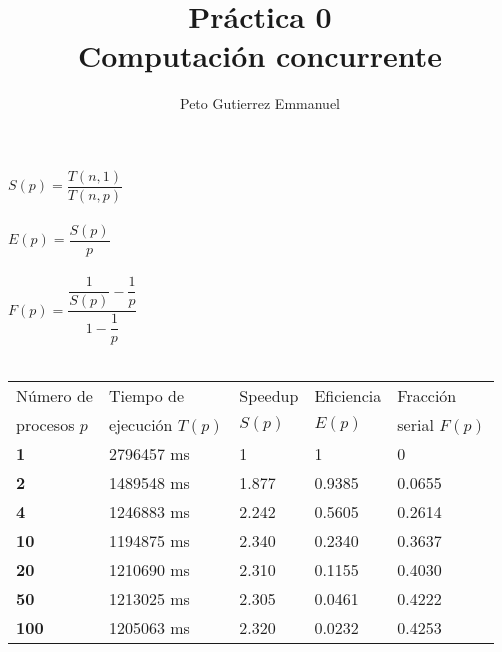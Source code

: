 \documentclass{article}
\title{Práctica 0 \\ Computación concurrente}
\author{Peto Gutierrez Emmanuel}
\begin{document}
\maketitle

$S(p)= \dfrac{T(n,1)}{T(n,p)}$ \\ \ \\

$E(p)= \dfrac{S(p)}{p}$ \\ \ \\

$F(p)= \dfrac{ \dfrac{1}{S(p)} - \dfrac{1}{p}}{1- \dfrac{1}{p}}$\\ \ \\

\begin{table}[htbp]
\begin{center}
\begin{tabular}{|l|l|l|l|l|}
\hline
Número de & Tiempo de & Speedup & Eficiencia & Fracción\\
procesos $p$ & ejecución $T(p)$ & $S(p)$ & $E(p)$ & serial $F(p)$ 
\\ \hline
\textbf{1} & 2796457 ms & 1 & 1 & 0 \\ \hline
\textbf{2} & 1489548 ms & 1.877 & 0.9385 & 0.0655 \\ \hline
\textbf{4} & 1246883 ms & 2.242 & 0.5605 & 0.2614 \\ \hline
\textbf{10} & 1194875 ms & 2.340 & 0.2340 & 0.3637 \\ \hline
\textbf{20} & 1210690 ms & 2.310 & 0.1155 & 0.4030\\ \hline
\textbf{50} & 1213025 ms & 2.305 & 0.0461 & 0.4222 \\ \hline
\textbf{100} & 1205063 ms & 2.320 & 0.0232 & 0.4253\\ \hline
\end{tabular}
\end{center}
\end{table}
\end{document}

